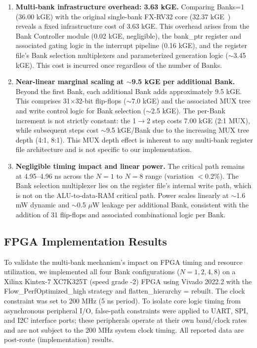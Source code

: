 \documentclass[letterpaper,journal]{IEEEtran}
\begin{document}
\begin{enumerate}
\item \textbf{Multi-bank infrastructure overhead: 3.63 kGE.} Comparing Banks=1 (36.00 kGE) with the original single-bank FX-RV32 core (32.37 kGE~\cite{ref1}) reveals a fixed infrastructure cost of 3.63 kGE. This overhead arises from the Bank Controller module (0.02 kGE, negligible), the bank\_ptr register and associated gating logic in the interrupt pipeline (0.16 kGE), and the register file's Bank selection multiplexers and parameterized generation logic ($\sim$3.45 kGE). This cost is incurred once regardless of the number of Banks.

\item \textbf{Near-linear marginal scaling at $\sim$9.5 kGE per additional Bank.} Beyond the first Bank, each additional Bank adds approximately 9.5 kGE. This comprises 31$\times$32-bit flip-flops ($\sim$7.0 kGE) and the associated MUX tree and write control logic for Bank selection ($\sim$2.5 kGE). The per-Bank increment is not strictly constant: the 1$\rightarrow$2 step costs 7.00 kGE (2:1 MUX), while subsequent steps cost $\sim$9.5 kGE/Bank due to the increasing MUX tree depth (4:1, 8:1). This MUX depth effect is inherent to any multi-bank register file architecture and is not specific to our implementation.

\item \textbf{Negligible timing impact and linear power.} The critical path remains at 4.95--4.96 ns across the $N=1$ to $N=8$ range (variation $<$0.2\%). The Bank selection multiplexer lies on the register file's internal write path, which is not on the ALU-to-data-RAM critical path. Power scales linearly at $\sim$1.6 mW dynamic and $\sim$0.5 $\mu$W leakage per additional Bank, consistent with the addition of 31 flip-flops and associated combinational logic per Bank.
\end{enumerate}

\subsection{FPGA Implementation Results}

To validate the multi-bank mechanism's impact on FPGA timing and resource utilization, we implemented all four Bank configurations ($N = 1, 2, 4, 8$) on a Xilinx Kintex-7 XC7K325T (speed grade -2) FPGA using Vivado 2022.2 with the Flow\_PerfOptimized\_high strategy and flatten\_hierarchy = rebuilt.
The clock constraint was set to 200 MHz (5 ns period).
To isolate core logic timing from asynchronous peripheral I/O, false-path constraints were applied to UART, SPI, and I2C interface ports; these peripherals operate at their own baud/clock rates and are not subject to the 200 MHz system clock timing.
All reported data are post-route (implementation) results.
\end{document}
